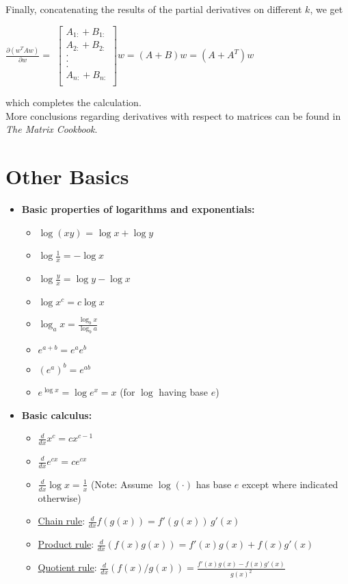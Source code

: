 \documentclass[11pt]{article}
\begin{document}
Finally, concatenating the results of the partial derivatives on different $k$, we get
    \begin{center}
    $\frac{\partial (w^{T}Aw)}{\partial w} =$
    $\begin{bmatrix}
    A_{1:}+B_{1:}\\ 
    A_{2:}+B_{2:} \\ . \\.\\.\\
    A_{n:}+B_{n:}\\
    \end{bmatrix} w = (A+B)w = (A+A^{T})w$ 
    \end{center}
which completes the calculation.\\

More conclusions regarding derivatives with respect to matrices can be found in \textit{The Matrix Cookbook}\cite{petersen2008matrix}.

\section{Other Basics}

\begin{itemize}
	\item {\bf Basic properties of logarithms and exponentials:}
	\begin{itemize}
		\item $\log (x y)$ = $\log x + \log y$    
		\item $\log \frac{1}{x} = - \log x$
		\item $\log \frac{y}{x} = \log y - \log x$
		\item $\log x^c = c \log x$
		\item $\log_a x = \frac{\log_b x}{\log_b a}$
		\item $e^{a+b} = e^a e^b$
		\item $(e^{a})^b = e^{ab}$
		\item $e^{\log x} = \log e^x = x$ (for $\log$ having base $e$)
	\end{itemize}
	
	\item {\bf Basic calculus:}
	\begin{itemize}
		\item $\frac{d}{dx} x^c = c x^{c-1}$
		\item $\frac{d}{dx} e^{cx} = c e^{cx}$
		\item $\frac{d}{dx} \log x = \frac{1}{x}$ (Note: Assume $\log(\cdot)$ has base $e$ except where indicated otherwise)
		\item \underline{Chain rule}: $\frac{d}{dx} f(g(x)) = f'( g(x) ) \, g'(x)$
		\item \underline{Product rule}: $\frac{d}{dx} (f(x)g(x)) = f'(x)g(x) + f(x)g'(x)$
		\item \underline{Quotient rule}: $\frac{d}{dx} (f(x)/g(x)) = \frac{ f'(x)g(x) - f(x)g'(x) }{g(x)^2} $
	\end{itemize}
\end{itemize}
\end{document}

